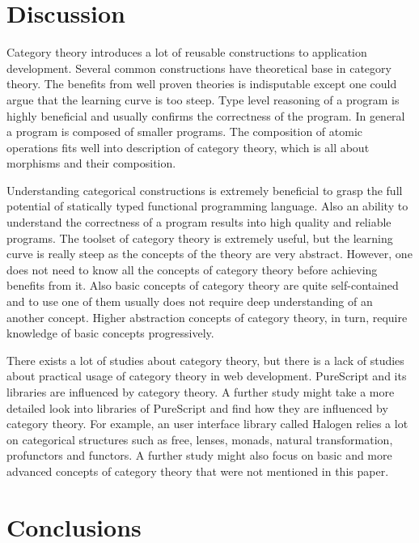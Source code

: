 \documentclass[article]{aaltoseries}
\begin{document}
\section{Discussion}

Category theory introduces a lot of reusable constructions to application
development. Several common constructions have theoretical base in category
theory. The benefits from well proven theories is indisputable except one could
argue that the learning curve is too steep. Type level reasoning of a program is
highly beneficial and usually confirms the correctness of the program. In
general a program is composed of smaller programs. The composition of atomic
operations fits well into description of category theory, which is all about
morphisms and their composition.
 
Understanding categorical constructions is extremely beneficial to grasp the
full potential of statically typed functional programming language. Also an
ability to understand the correctness of a program results into high quality and
reliable programs. The toolset of category theory is extremely useful, but the
learning curve is really steep as the concepts of the theory are very abstract.
However, one does not need to know all the concepts of category theory before
achieving benefits from it. Also basic concepts of category theory are quite
self-contained and to use one of them usually does not require deep
understanding of an another concept. Higher abstraction concepts of category
theory, in turn, require knowledge of basic concepts progressively.
 
There exists a lot of studies about category theory, but there is a lack of
studies about practical usage of category theory in web development. PureScript
and its libraries are influenced by category theory. A further study might take
a more detailed look into libraries of PureScript and find how they are
influenced by category theory. For example, an user interface library called
Halogen relies a lot on categorical structures such as free, lenses, monads,
natural transformation, profunctors and functors. A further study might also
focus on basic and more advanced concepts of category theory that were not
mentioned in this paper.



\section{Conclusions}
\end{document}
